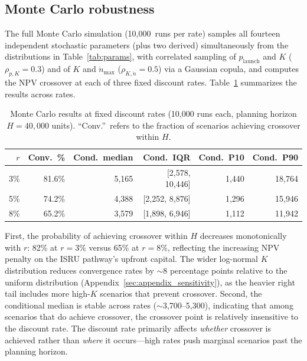 \documentclass[preprint,12pt]{elsarticle}
\begin{document}
\subsection{Monte Carlo robustness}
\label{sec:mc_robustness}

The full Monte Carlo simulation (10{,}000~runs per rate) samples all fourteen independent stochastic parameters (plus two derived) simultaneously from the distributions in Table~\ref{tab:params}, with correlated sampling of $p_{\mathrm{launch}}$ and $K$ ($\rho_{p,K} = 0.3$) and of $K$ and $\dot{n}_{\max}$ ($\rho_{K,\dot{n}} = 0.5$) via a Gaussian copula, and computes the NPV crossover at each of three fixed discount rates. Table~\ref{tab:mc_summary} summarizes the results across rates.

\begin{table}[htbp]
\centering
\caption{Monte Carlo results at fixed discount rates (10{,}000 runs each, planning horizon $H = 40{,}000$ units). ``Conv.''\ refers to the fraction of scenarios achieving crossover within $H$.}
\label{tab:mc_summary}
\small
\begin{tabular}{@{}rrrrrr@{}}
\toprule
$r$ & Conv.\ \% & Cond.\ median & Cond.\ IQR & Cond.\ P10 & Cond.\ P90 \\
\midrule
3\%  & 81.6\% & 5{,}165 & [2{,}578, 10{,}446] & 1{,}440 & 18{,}764 \\
5\%  & 74.2\% & 4{,}388 & [2{,}252, 8{,}876]  & 1{,}296 & 15{,}946 \\
8\%  & 65.2\% & 3{,}579 & [1{,}898, 6{,}946]  & 1{,}112 & 11{,}942 \\
\bottomrule
\end{tabular}
\end{table}

First, the probability of achieving crossover within $H$ decreases monotonically with $r$: 82\% at $r = 3\%$ versus 65\% at $r = 8\%$, reflecting the increasing NPV penalty on the ISRU pathway's upfront capital. The wider log-normal $K$ distribution reduces convergence rates by $\sim$8 percentage points relative to the uniform distribution (Appendix~\ref{sec:appendix_sensitivity}), as the heavier right tail includes more high-$K$ scenarios that prevent crossover. Second, the conditional median is stable across rates ($\sim$3{,}700--5{,}300), indicating that among scenarios that do achieve crossover, the crossover point is relatively insensitive to the discount rate. The discount rate primarily affects \emph{whether} crossover is achieved rather than \emph{where} it occurs---high rates push marginal scenarios past the planning horizon.
\end{document}
